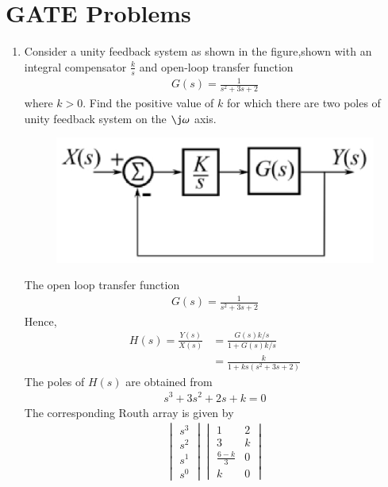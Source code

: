 \documentclass[journal,12pt,twocolumn]{IEEEtran}
\renewcommand\thesection{\arabic{section}}
\begin{document}
\section{GATE Problems}
\begin{enumerate}[label=\arabic*.,ref=\thesection.\theenumi]

\item Consider a unity feedback system as shown in the figure,shown with an integral compensator $\frac{k}{s}$ and open-loop transfer function
\begin{align}
 G(s) = \frac{1}{s^2+3s+2}
\end{align}   
   where $k>0$. Find the positive value of $k$ for which there are two poles of unity feedback system on the $\j\omega$ axis.
 \begin{figure}[!ht]
\centering
     \includegraphics[width=\columnwidth]{./figs/gate.eps}
\caption{}
\label{fig:routh}
    \end{figure}

\solution  The open loop transfer function
%
\begin{align}
G(s) = \frac{1}{s^2+3s+2}
\end{align}
%
Hence,
\begin{align}
H(s) = \frac{Y(s)}{X(s)} &= \frac{G(s)k/s}{1+G(s)k/s}
\\
&=  \frac{k}{1 + ks(s^2+3s+2)}
\end{align}
%
The poles of $H(s)$ are obtained from 
\begin{align}
s^3+3s^2+2s+k = 0
\end{align}
%
The corresponding Routh array is given by 
\begin{align}
\begin{vmatrix}
s^3\\s^2\\s^1 \\ s^0 
\end{vmatrix} 
\begin{vmatrix}
1 & 2 \\ 3 & k \\  \frac{6-k}{3} & 0\\ k & 0
\end{vmatrix}
\end{align}


\end{enumerate}
\end{document}
